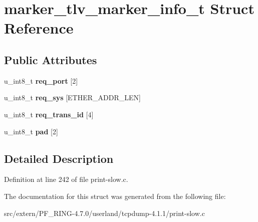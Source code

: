 \hypertarget{structmarker__tlv__marker__info__t}{
\section{marker\_\-tlv\_\-marker\_\-info\_\-t Struct Reference}
\label{structmarker__tlv__marker__info__t}
}
\subsection*{Public Attributes}
\begin{DoxyCompactItemize}
\item 
\hypertarget{structmarker__tlv__marker__info__t_a396d31c054ecc1172e08177c67676f4a}{
u\_\-int8\_\-t {\bfseries req\_\-port} \mbox{[}2\mbox{]}}
\label{structmarker__tlv__marker__info__t_a396d31c054ecc1172e08177c67676f4a}

\item 
\hypertarget{structmarker__tlv__marker__info__t_a360a511ea99ea995e2b8387604003c5e}{
u\_\-int8\_\-t {\bfseries req\_\-sys} \mbox{[}ETHER\_\-ADDR\_\-LEN\mbox{]}}
\label{structmarker__tlv__marker__info__t_a360a511ea99ea995e2b8387604003c5e}

\item 
\hypertarget{structmarker__tlv__marker__info__t_ade71b672db0d116c1210a41ecf0bba44}{
u\_\-int8\_\-t {\bfseries req\_\-trans\_\-id} \mbox{[}4\mbox{]}}
\label{structmarker__tlv__marker__info__t_ade71b672db0d116c1210a41ecf0bba44}

\item 
\hypertarget{structmarker__tlv__marker__info__t_ae41d4adc36078feeac038def33d12296}{
u\_\-int8\_\-t {\bfseries pad} \mbox{[}2\mbox{]}}
\label{structmarker__tlv__marker__info__t_ae41d4adc36078feeac038def33d12296}

\end{DoxyCompactItemize}


\subsection{Detailed Description}


Definition at line 242 of file print-\/slow.c.



The documentation for this struct was generated from the following file:\begin{DoxyCompactItemize}
\item 
src/extern/PF\_\-RING-\/4.7.0/userland/tcpdump-\/4.1.1/print-\/slow.c\end{DoxyCompactItemize}

